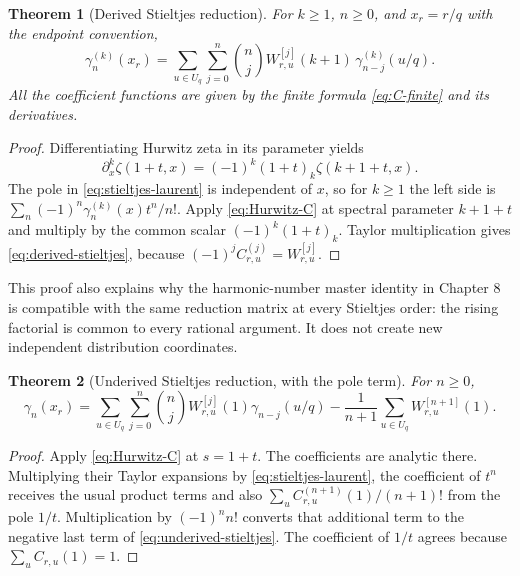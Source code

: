 \documentclass[11pt]{article}
\numberwithin{equation}{section}
\newtheorem{theorem}{Theorem}[section]
\theoremstyle{definition}
\theoremstyle{remark}
\begin{document}
\begin{theorem}[Derived Stieltjes reduction]\label{thm:derived-stieltjes}
For $k\ge1$, $n\ge0$, and $x_r=r/q$ with the endpoint convention,
\begin{equation}\label{eq:derived-stieltjes}
 \boxed{\displaystyle
 \gamma_n^{(k)}(x_r)=
 \sum_{u\in U_q}\sum_{j=0}^n\binom nj
 W_{r,u}^{[j]}(k+1)\,
 \gamma_{n-j}^{(k)}(u/q).}
\end{equation}
All the coefficient functions are given by the finite formula
\eqref{eq:C-finite} and its derivatives.
\end{theorem}
\begin{proof}
Differentiating Hurwitz zeta in its parameter yields
\[
 \partial_x^k\zeta(1+t,x)=(-1)^k(1+t)_k\zeta(k+1+t,x).
\]
The pole in \eqref{eq:stieltjes-laurent} is independent of $x$, so for
$k\ge1$ the left side is
$\sum_n(-1)^n\gamma_n^{(k)}(x)t^n/n!$.
Apply \eqref{eq:Hurwitz-C} at spectral parameter $k+1+t$ and multiply
by the common scalar $(-1)^k(1+t)_k$. Taylor multiplication gives
\eqref{eq:derived-stieltjes}, because
$(-1)^j C_{r,u}^{(j)}=W_{r,u}^{[j]}$.
\end{proof}

This proof also explains why the harmonic-number master identity in
Chapter 8 is compatible with the same reduction matrix at every
Stieltjes order: the rising factorial is common to every rational
argument. It does not create new independent distribution coordinates.

\begin{theorem}[Underived Stieltjes reduction, with the pole term]\label{thm:underived}
For $n\ge0$,
\begin{equation}\label{eq:underived-stieltjes}
 \boxed{\displaystyle
 \gamma_n(x_r)=
 \sum_{u\in U_q}\sum_{j=0}^n\binom nj
 W_{r,u}^{[j]}(1)\gamma_{n-j}(u/q)
 -\frac1{n+1}\sum_{u\in U_q}W_{r,u}^{[n+1]}(1).}
\end{equation}
\end{theorem}
\begin{proof}
Apply \eqref{eq:Hurwitz-C} at $s=1+t$. The coefficients are analytic
there. Multiplying their Taylor expansions by
\eqref{eq:stieltjes-laurent}, the coefficient of $t^n$ receives the
usual product terms and also
$\sum_u C_{r,u}^{(n+1)}(1)/(n+1)!$ from the pole $1/t$.
Multiplication by $(-1)^n n!$ converts that additional term to the
negative last term of \eqref{eq:underived-stieltjes}. The coefficient
of $1/t$ agrees because $\sum_u C_{r,u}(1)=1$.
\end{proof}
\end{document}
